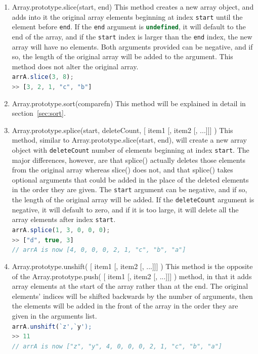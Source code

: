 \documentclass[a4paper,11pt,twoside]{report}
\def\jsinline{\lstinline[language=JavaScript, basicstyle=\small]}%\end{lstlisting}
\begin{document}
\begin{enumerate}
\item Array.prototype.slice(start, end) \newline
This method creates a new array object, and adds into it the original array elements beginning at index \jsinline|start| until the element before \jsinline|end|. If the \jsinline|end| argument is \jsinline|undefined|, it will default to the end of the array, and if the \jsinline|start| index is larger than the \jsinline|end| index, the new array will have no elements. Both arguments provided can be negative, and if so, the length of the original array will be added to the argument. This method does not alter the original array.\\
\jsinline|arrA.slice(3, 8);|\\
\jsinline|>> [3, 2, 1, "c", "b"]|

\item Array.prototype.sort(comparefn) \newline
This method will be explained in detail in section~\ref{sec:sort}.

\item Array.prototype.splice(start, deleteCount, [ item1 [, item2 [, ...]]] ) \newline
This method, similar to Array.prototype.slice(start, end), will create a new array object with \jsinline|deleteCount| number of elements beginning at index \jsinline|start|. The major differences, however, are that splice() actually deletes those elements from the original array whereas slice() does not, and that splice() takes optional arguments that could be added in the place of the deleted elements in the order they are given. The \jsinline|start| argument can be negative, and if so, the length of the original array will be added. If the \jsinline|deleteCount| argument is negative, it will default to zero, and if it is too large, it will delete all the array elements after index \jsinline|start|. \\
\jsinline|arrA.splice(1, 3, 0, 0, 0);|\\
\jsinline|>> ["d", true, 3]| \\
\jsinline|// arrA is now [4, 0, 0, 0, 2, 1, "c", "b", "a"]|

\item Array.prototype.unshift( [ item1 [, item2 [, ...]]] ) \newline
This method is the opposite of the Array.prototype.push( [ item1 [, item2 [, ...]]] ) method, in that it adds array elements at the start of the array rather than at the end. The original elements' indices will be shifted backwards by the number of arguments, then the elements will be added in the front of the array in the order they are given in the arguments list. \\
\jsinline|arrA.unshift(`z',`y');|\\
\jsinline|>> 11| \\
\jsinline|// arrA is now ["z", "y", 4, 0, 0, 0, 2, 1, "c", "b", "a"]|


\end{enumerate}
\end{document}
